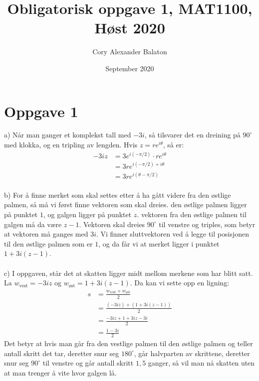 \documentclass[12pt, a4paper]{article}
\title{Obligatorisk oppgave 1, MAT1100, Høst 2020}
\author{Cory Alexander Balaton}
\date{September 2020}
\begin{document}
\maketitle
\newpage


\section*{Oppgave 1}
a) Når man ganger et komplekst tall med $-3i$, så tilsvarer det en dreining på $90^\circ$ med klokka, og en tripling av lengden.
Hvis $z = re^{i\theta}$, så er:
\begin{equation}
    \begin{split}
        -3iz &= 3e^{i(-\pi/2)} \cdot re^{i\theta} \\
             &= 3re^{i(-\pi/2) + i\theta} \\
             &= 3re^{i(\theta - \pi/2)}
    \end{split}
\end{equation}
\\
b) For å finne merket som skal settes etter å ha gått videre fra den østlige palmen, så må vi først finne vektoren som skal dreies.
den østlige palmen ligger på punktet $1$, og galgen ligger på punktet $z$. vektoren fra den østlige palmen til galgen må da være $z - 1$.
Vektoren skal dreies $90^\circ$ til venstre og triples, som betyr at vektoren må ganges med $3i$.
Vi finner sluttvektoren ved å legge til posisjonen til den østlige palmen som er $1$, og da får vi at merket ligger i punktet $1 + 3i(z - 1)$. \\
\\
c) I oppgaven, står det at skatten ligger midt mellom merkene som har blitt satt. La $w_{\text{vest}} = -3iz$ og $w_{\text{øst}} = 1 + 3i(z-1)$. Da kan vi sette opp en ligning:
\begin{equation}
    \begin{split}
        s &= \frac{w_{\text{vest}} + w_{\text{øst}}}{2} \\
          &= \frac{(-3iz) + (1 + 3i(z-1))}{2} \\
          &= \frac{-3iz + 1 + 3iz - 3i}{2} \\
          &= \frac{1 - 3i}{2}
    \end{split}
\end{equation}
Det betyr at hvis man går fra den vestlige palmen til den østlige palmen og teller antall skritt det tar, deretter snur seg $180^\circ$, går halvparten av skrittene, deretter
snur seg $90^\circ$ til venstre og går antall skritt $1,5$ ganger, så vil man nå skatten uten at man trenger å vite hvor galgen lå.
\newpage
\end{document}
